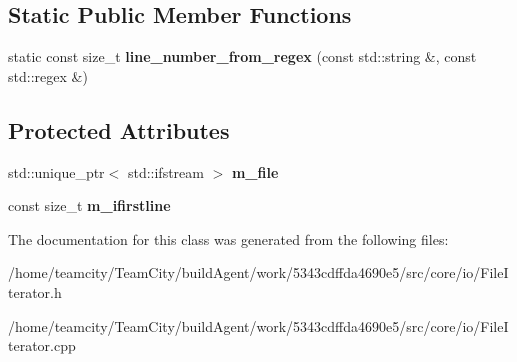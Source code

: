 \subsection*{Static Public Member Functions}
\begin{DoxyCompactItemize}
\item 
static const size\+\_\+t {\bfseries line\+\_\+number\+\_\+from\+\_\+regex} (const std\+::string \&, const std\+::regex \&)\hypertarget{classFileIterator_a2e1901e8154e12ea1e103989962b238c}{}\label{classFileIterator_a2e1901e8154e12ea1e103989962b238c}

\end{DoxyCompactItemize}
\subsection*{Protected Attributes}
\begin{DoxyCompactItemize}
\item 
std\+::unique\+\_\+ptr$<$ std\+::ifstream $>$ {\bfseries m\+\_\+file}\hypertarget{classFileIterator_afe5d32129b4d436512b8704062931a53}{}\label{classFileIterator_afe5d32129b4d436512b8704062931a53}

\item 
const size\+\_\+t {\bfseries m\+\_\+ifirstline}\hypertarget{classFileIterator_aa722ca5315390534e9312a796fcbe48b}{}\label{classFileIterator_aa722ca5315390534e9312a796fcbe48b}

\end{DoxyCompactItemize}


The documentation for this class was generated from the following files\+:\begin{DoxyCompactItemize}
\item 
/home/teamcity/\+Team\+City/build\+Agent/work/5343cdffda4690e5/src/core/io/File\+Iterator.\+h\item 
/home/teamcity/\+Team\+City/build\+Agent/work/5343cdffda4690e5/src/core/io/File\+Iterator.\+cpp\end{DoxyCompactItemize}
